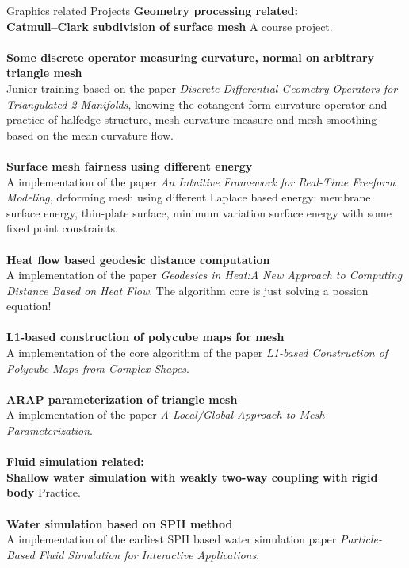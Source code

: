 \documentclass{resume} %
\begin{document}
\begin{rSection}{Graphics related Projects}
         \textbf{Geometry processing related:}\\
                {\bf Catmull–Clark subdivision of surface mesh} A course project.\\\\
                {\bf Some discrete operator measuring  curvature, normal on arbitrary triangle mesh}\\Junior training based on the paper \emph{Discrete Differential-Geometry Operators for Triangulated 2-Manifolds}, knowing the cotangent form curvature operator and practice of halfedge structure, mesh curvature measure and mesh smoothing based on the mean curvature flow.\\\\
                {\bf Surface mesh fairness using different energy}\\A implementation of the paper \emph{An Intuitive Framework for Real-Time Freeform Modeling}, deforming mesh using different Laplace based energy: membrane surface energy, thin-plate surface, minimum variation surface energy with some fixed point constraints.\\\\
                {\bf Heat flow based geodesic distance computation}\\A implementation of the paper \emph{Geodesics in Heat:A New Approach to Computing Distance Based on Heat Flow}. The algorithm core is just solving a possion equation!\\\\
                {\bf L1-based construction of polycube maps for mesh}\\ A implementation of the core algorithm of the paper \emph{L1-based Construction of Polycube Maps from Complex Shapes}.\\\\
                {\bf ARAP parameterization of triangle mesh}\\A implementation of the paper \emph{A Local/Global Approach to Mesh Parameterization}.\\\\
         \textbf{Fluid simulation related:}\\
                {\bf Shallow water simulation with weakly two-way coupling with rigid body} Practice.\\\\
                {\bf Water simulation based on SPH method}\\A implementation of the earliest SPH based water simulation paper \emph{Particle-Based Fluid Simulation for Interactive Applications}.\\\\                

\end{rSection}
\end{document}
